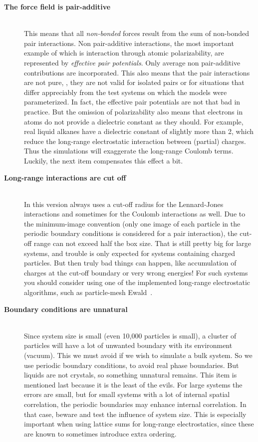 \begin{description}
\item[{\bf The force field is pair-additive}]\mbox{}\\
This means that all {\em non-bonded} forces result from the sum of
non-bonded pair interactions. Non pair-additive interactions, the most
important example of which is interaction through atomic
polarizability, are represented by {\em effective pair
potentials}. Only average non pair-additive contributions are
incorporated. This also means that the pair interactions are not pure,
{\ie}, they are not valid for isolated pairs or for situations
that differ appreciably from the test systems on which the models were
parameterized. In fact, the effective pair potentials are not that bad
in practice. But the omission of polarizability also means that
electrons in atoms do not provide a dielectric constant as they
should. For example, real liquid alkanes have a dielectric constant of
slightly more than 2, which reduce the long-range electrostatic
interaction between (partial) charges. Thus the simulations will
exaggerate the long-range Coulomb terms. Luckily, the next item
compensates this effect a bit.

\item[{\bf Long-range interactions are cut off}]\mbox{}\\
In this version {\gromacs} always uses a cut-off radius for the
Lennard-Jones interactions and sometimes for the Coulomb interactions
as well.  Due to the minimum-image convention (only one image of each
particle in the periodic boundary conditions is considered for a pair
interaction), the cut-off range can not exceed half the box size. That
is still pretty big for large systems, and trouble is only expected
for systems containing charged particles. But then truly bad things can
happen, like accumulation of charges at the cut-off boundary or very
wrong energies! For such systems you should consider using one of the
implemented long-range electrostatic algorithms, such as 
particle-mesh Ewald~\cite{Darden93,Essmann95}.

\item[{\bf Boundary conditions are unnatural}]\mbox{}\\
Since system size is small (even 10,000 particles is small), a cluster
of particles will have a lot of unwanted boundary with its environment
(vacuum). This we must avoid if we wish to simulate a bulk system. So
we use periodic boundary conditions, to avoid real phase
boundaries. But liquids are not crystals, so something unnatural
remains. This item is mentioned last because it is the
least of the evils. For large systems the errors are small, but for
small systems with a lot of internal spatial correlation, the periodic
boundaries may enhance internal correlation. In that case, beware and
test the influence of system size. This is especially important when
using lattice sums for long-range electrostatics, since these are known
to sometimes introduce extra ordering.
\end{description}

